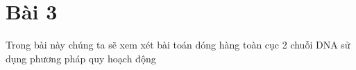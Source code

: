 \section{Bài 3}
Trong bài này chúng ta sẽ xem xét bài toán dóng hàng
toàn cục 2 chuỗi DNA sử dụng phương pháp quy hoạch động